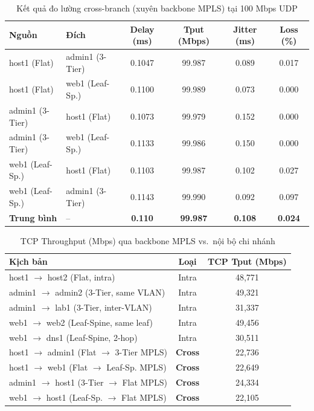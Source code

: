 \begin{table}[H]
    \centering
    \caption{Kết quả đo lường cross-branch (xuyên backbone MPLS) tại 100 Mbps UDP}
    \vspace{0.2cm}
    \small
    \begin{tabularx}{\textwidth}{|>{\raggedright\arraybackslash}p{3.0cm}|>{\raggedright\arraybackslash}p{3.0cm}|c|c|c|c|}
        \hline
        \textbf{Nguồn} & \textbf{Đích} & \textbf{Delay (ms)} & \textbf{Tput (Mbps)} & \textbf{Jitter (ms)} & \textbf{Loss (\%)} \\ \hline
        host1 (Flat) & admin1 (3-Tier) & 0.1047 & 99.987 & 0.089 & 0.017 \\ \hline
        host1 (Flat) & web1 (Leaf-Sp.) & 0.1100 & 99.989 & 0.073 & 0.000 \\ \hline
        admin1 (3-Tier) & host1 (Flat) & 0.1073 & 99.979 & 0.152 & 0.000 \\ \hline
        admin1 (3-Tier) & web1 (Leaf-Sp.) & 0.1133 & 99.986 & 0.150 & 0.000 \\ \hline
        web1 (Leaf-Sp.) & host1 (Flat) & 0.1103 & 99.987 & 0.102 & 0.027 \\ \hline
        web1 (Leaf-Sp.) & admin1 (3-Tier) & 0.1143 & 99.990 & 0.092 & 0.097 \\ \hline
        \textbf{Trung bình} & -- & \textbf{0.110} & \textbf{99.987} & \textbf{0.108} & \textbf{0.024} \\ \hline
    \end{tabularx}
    \label{tab:cross_results}
\end{table}

\begin{table}[H]
    \centering
    \caption{TCP Throughput (Mbps) qua backbone MPLS vs.\ nội bộ chi nhánh}
    \vspace{0.2cm}
    \small
    \begin{tabularx}{\textwidth}{|>{\raggedright\arraybackslash}X|c|c|}
        \hline
        \textbf{Kịch bản} & \textbf{Loại} & \textbf{TCP Tput (Mbps)} \\ \hline
        host1 $\to$ host2 (Flat, intra) & Intra & 48{,}771 \\ \hline
        admin1 $\to$ admin2 (3-Tier, same VLAN) & Intra & 49{,}321 \\ \hline
        admin1 $\to$ lab1 (3-Tier, inter-VLAN) & Intra & 31{,}337 \\ \hline
        web1 $\to$ web2 (Leaf-Spine, same leaf) & Intra & 49{,}456 \\ \hline
        web1 $\to$ dns1 (Leaf-Spine, 2-hop) & Intra & 30{,}511 \\ \hline
        host1 $\to$ admin1 (Flat $\to$ 3-Tier MPLS) & \textbf{Cross} & 22{,}736 \\ \hline
        host1 $\to$ web1 (Flat $\to$ Leaf-Sp. MPLS) & \textbf{Cross} & 22{,}649 \\ \hline
        admin1 $\to$ host1 (3-Tier $\to$ Flat MPLS) & \textbf{Cross} & 24{,}334 \\ \hline
        web1 $\to$ host1 (Leaf-Sp. $\to$ Flat MPLS) & \textbf{Cross} & 22{,}105 \\ \hline
    \end{tabularx}
    \label{tab:tcp_tput}
\end{table}

